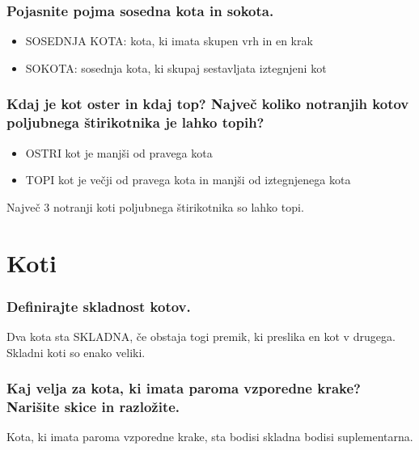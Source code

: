 \documentclass{article}
\begin{document}
\subsubsection*{Pojasnite pojma sosedna kota in sokota.}

\begin{itemize}
    \item SOSEDNJA KOTA: kota, ki imata skupen vrh in en krak
    \item SOKOTA: sosednja kota, ki skupaj sestavljata iztegnjeni kot
\end{itemize}


\subsubsection*{Kdaj je kot oster in kdaj top? Največ koliko notranjih kotov poljubnega štirikotnika je lahko topih?}

\begin{itemize}
    \item OSTRI kot je manjši od pravega kota
    \item TOPI kot je večji od pravega kota in manjši od iztegnjenega kota
\end{itemize}

Največ 3 notranji koti poljubnega štirikotnika so lahko topi.
\section{Koti}

\subsubsection*{Definirajte skladnost kotov.}

Dva kota sta SKLADNA, če obstaja togi premik, ki preslika en kot v drugega. Skladni koti so enako veliki.

\subsubsection*{Kaj velja za kota, ki imata paroma vzporedne krake? Narišite skice in razložite.}

Kota, ki imata paroma vzporedne krake, sta bodisi skladna bodisi suplementarna.
\end{document}
